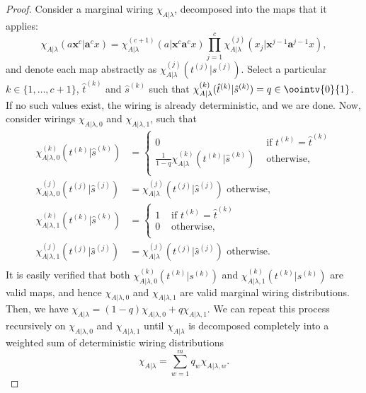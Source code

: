 \documentclass[10pt, a4paper]{article}
\numberwithin{equation}{section} %
\theoremstyle{definition}
\theoremstyle{plain}
\newcommand{\dintv}[2]{\mathopen\{#1,\ldots,#2\mathclose\}}
\newcommand{\?}{\mathrel{?}} %
\newcommand{\cvec}[1]{\boldsymbol{\mathbf{#1}}}    %
\begin{document}
              \begin{proof}
                Consider a marginal wiring \(\chi_{A|\lambda}\), decomposed into the maps that it applies:
                \begin{equation}\label{eqn:mapdecomp}
                  \chi_{A|\lambda}(a\cvec{x}^c|\cvec{a}^cx) = \chi_{A|\lambda}^{(c+1)}(a|\cvec{x}^c\cvec{a}^{c}x) \prod_{j=1}^c \chi_{A|\lambda}^{(j)}(x_j|\cvec{x}^{j-1}\cvec{a}^{j-1}x),
                \end{equation}
                and denote each map abstractly as \(\chi_{A|\lambda}^{(j)}(t^{(j)}|s^{(j)})\).
                Select a particular \(k\in\dintv{1}{c+1}\), \(\hat{t}^{(k)}\) and \(\hat{s}^{(k)}\) such that \(\chi_{A|\lambda}^{(k)}(\hat{t}^{(k)}|\hat{s}^{(k)}) = q \in \oointv{0}{1}\). If no such values exist, the wiring is already deterministic, and we are done.
                Now, consider wirings \(\chi_{A|\lambda,0}\) and \(\chi_{A|\lambda,1}\), such that
                \begin{align*}
                  \chi^{(k)}_{A|\lambda,0}(t^{(k)}|\hat{s}^{(k)}) &= \begin{cases}
                    0 & \text{ if } t^{(k)} = \hat{t}^{(k)} \\
                    \frac{1}{1-q} \chi_{A|\lambda}^{(k)}(t^{(k)}|\hat{s}^{(k)}) & \text{ otherwise,} \\
                  \end{cases} \\
                      \chi^{(j)}_{A|\lambda,0}(t^{(j)}|\hat{s}^{(j)}) &= \chi_{A|\lambda}^{(j)}(t^{(j)}|\hat{s}^{(j)}) \text{ otherwise,} \\
                    \chi^{(k)}_{A|\lambda,1}(t^{(k)}|\hat{s}^{(k)}) &= \begin{cases}
                      1 & \text{ if } t^{(k)} = \hat{t}^{(k)} \\
                      0 & \text{ otherwise,} \\
                    \end{cases} \\
                      \chi^{(j)}_{A|\lambda,1}(t^{(j)}|\hat{s}^{(j)}) &= \chi_{A|\lambda}^{(j)}(t^{(j)}|\hat{s}^{(j)}) \text{ otherwise.} \\
                    \end{align*}
                    It is easily verified that both \(\chi_{A|\lambda,0}^{(k)}(t^{(k)}|s^{(k)})\) and \(\chi_{A|\lambda,1}^{(k)}(t^{(k)}|s^{(k)})\) are valid maps, and hence \(\chi_{A|\lambda,0}\) and \(\chi_{A|\lambda,1}\) are valid marginal wiring distributions. Then, we have \(\chi_{A|\lambda} = (1-q)\chi_{A|\lambda,0} + q\chi_{A|\lambda,1}\). We can repeat this process recursively on \(\chi_{A|\lambda,0}\) and \(\chi_{A|\lambda,1}\) until \(\chi_{A|\lambda}\) is decomposed completely into a weighted sum of deterministic wiring distributions
                    \[ \chi_{A|\lambda} = \sum_{w=1}^m q_w \chi_{A|\lambda,w}. \]


\end{proof}
\end{document}
